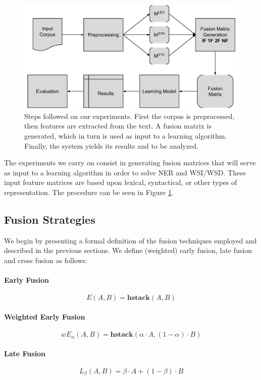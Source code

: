 \documentclass{llncs}
\begin{document}
\begin{figure}[t]
\centering

\includegraphics[width=0.85\linewidth]{img/diag_metodo}
\caption{Steps followed on our experiments. First the corpus is preprocessed, then features are extracted from the text. A fusion matrix is generated, which in turn is used as input to a learning algorithm. Finally, the system yields its results and to be analyzed.}
\label{fig:diagmetodo}
\end{figure}

The experiments we carry on consist in generating fusion matrices that will serve as input to a learning algorithm in order to solve NER and WSI/WSD. These input feature matrices are based upon lexical, syntactical, or other types of representation. The procedure can be seen in Figure \ref{fig:diagmetodo}.

\subsection{Fusion Strategies}
We begin by presenting a  formal definition of the fusion techniques employed and described in the previous sections. We define (weighted) early fusion, late fusion and cross fusion as follows:
\paragraph{Early Fusion}
\begin{equation}
E(A,B) = \mathbf{hstack}(A , B)
\end{equation}
\paragraph{Weighted Early Fusion}
\begin{equation}
wE_\alpha(A,B) = \mathbf{hstack}(\alpha\cdot A , (1-\alpha)\cdot B)
\end{equation}
\paragraph{Late Fusion}
\begin{equation} \label{eq:late-fusion}
L_\beta(A,B) = \beta \cdot A + (1 - \beta)\cdot B
\end{equation}
\end{document}
